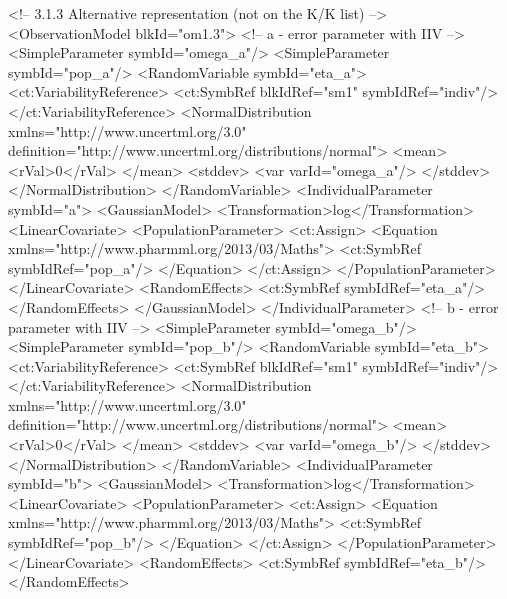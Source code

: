 \documentclass[a4paper,10pt]{article}
\begin{document}
\begin{xmlcode}
<!-- 3.1.3	Alternative representation (not on the K/K list) -->
<ObservationModel blkId="om1.3">
    <!-- a - error parameter with IIV -->
    <SimpleParameter symbId="omega_a"/>
    <SimpleParameter symbId="pop_a"/>
    <RandomVariable symbId="eta_a">
        <ct:VariabilityReference>
            <ct:SymbRef blkIdRef="sm1" symbIdRef="indiv"/>
        </ct:VariabilityReference>
        <NormalDistribution xmlns="http://www.uncertml.org/3.0" definition="http://www.uncertml.org/distributions/normal">
            <mean>
                <rVal>0</rVal>
            </mean>
            <stddev>
                <var varId="omega_a"/>
            </stddev>
        </NormalDistribution>
    </RandomVariable>
    <IndividualParameter symbId="a">
        <GaussianModel>
            <Transformation>log</Transformation>
            <LinearCovariate>
                <PopulationParameter>
                    <ct:Assign>
                        <Equation xmlns="http://www.pharmml.org/2013/03/Maths">
                            <ct:SymbRef symbIdRef="pop_a"/>
                        </Equation>
                    </ct:Assign>
                </PopulationParameter>
            </LinearCovariate>
            <RandomEffects>
                <ct:SymbRef symbIdRef="eta_a"/>
            </RandomEffects>
        </GaussianModel>
    </IndividualParameter>
    <!-- b - error parameter with IIV -->
    <SimpleParameter symbId="omega_b"/>
    <SimpleParameter symbId="pop_b"/>
    <RandomVariable symbId="eta_b">
        <ct:VariabilityReference>
            <ct:SymbRef blkIdRef="sm1" symbIdRef="indiv"/>
        </ct:VariabilityReference>
        <NormalDistribution xmlns="http://www.uncertml.org/3.0" definition="http://www.uncertml.org/distributions/normal">
            <mean>
                <rVal>0</rVal>
            </mean>
            <stddev>
                <var varId="omega_b"/>
            </stddev>
        </NormalDistribution>
    </RandomVariable>
    <IndividualParameter symbId="b">
        <GaussianModel>
            <Transformation>log</Transformation>
            <LinearCovariate>
                <PopulationParameter>
                    <ct:Assign>
                        <Equation xmlns="http://www.pharmml.org/2013/03/Maths">
                            <ct:SymbRef symbIdRef="pop_b"/>
                        </Equation>
                    </ct:Assign>
                </PopulationParameter>
            </LinearCovariate>
            <RandomEffects>
                <ct:SymbRef symbIdRef="eta_b"/>
            </RandomEffects>

\end{xmlcode}
\end{document}

